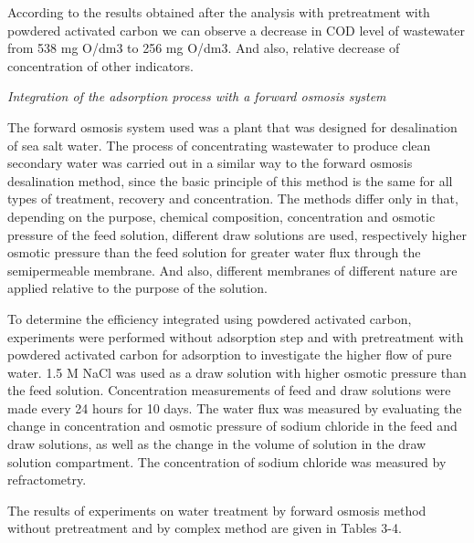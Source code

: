 \begin{multicols}{2}
According to the results obtained after the analysis with pretreatment
with powdered activated carbon we can observe a decrease in COD level of
wastewater from 538 mg O/dm3 to 256 mg O/dm3. And also, relative
decrease of concentration of other indicators.

\emph{Integration of the adsorption process with a forward osmosis
system}

The forward osmosis system used was a plant that was designed for
desalination of sea salt water. The process of concentrating wastewater
to produce clean secondary water was carried out in a similar way to the
forward osmosis desalination method, since the basic principle of this
method is the same for all types of treatment, recovery and
concentration. The methods differ only in that, depending on the
purpose, chemical composition, concentration and osmotic pressure of the
feed solution, different draw solutions are used, respectively higher
osmotic pressure than the feed solution for greater water flux through
the semipermeable membrane. And also, different membranes of different
nature are applied relative to the purpose of the solution.

To determine the efficiency integrated using powdered activated carbon,
experiments were performed without adsorption step and with pretreatment
with powdered activated carbon for adsorption to investigate the higher
flow of pure water. 1.5 M NaCl was used as a draw solution with higher
osmotic pressure than the feed solution. Concentration measurements of
feed and draw solutions were made every 24 hours for 10 days. The water
flux was measured by evaluating the change in concentration and osmotic
pressure of sodium chloride in the feed and draw solutions, as well as
the change in the volume of solution in the draw solution compartment.
The concentration of sodium chloride was measured by refractometry.

The results of experiments on water treatment by forward osmosis method
without pretreatment and by complex method are given in Tables 3-4.
\end{multicols}

